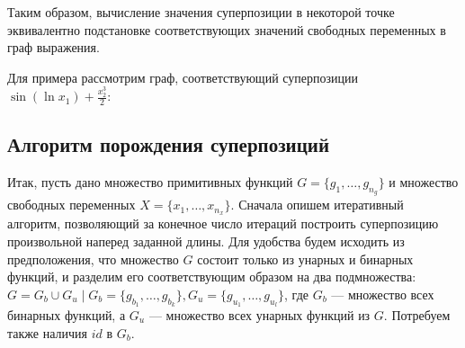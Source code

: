 \documentclass[12pt,a4paper]{amsart}
\begin{document}
Таким образом, вычисление значения суперпозиции в некоторой точке эквивалентно
подстановке соответствующих значений свободных переменных в граф выражения.

Для примера рассмотрим граф, соответствующий суперпозиции
$\sin (\ln x_1) + \frac{x_2^3}{2}$:


\subsection{Алгоритм порождения суперпозиций}

Итак, пусть дано множество примитивных функций $G = \{ g_1, \dots, g_{n_g} \}$ и
множество свободных переменных $X = \{ x_1, \dots, x_{n_x} \}$. Сначала
опишем итеративный алгоритм, позволяющий за конечное число итераций
построить суперпозицию произвольной наперед заданной длины. Для удобства
будем исходить из предположения, что множество $G$ состоит только из унарных
и бинарных функций, и разделим его соответствующим образом на два
подмножества:
$G = G_b \cup G_u \mid G_b = \{ g_{b_1}, \dots, g_{b_k} \}, G_u = \{ g_{u_1}, \dots, g_{u_l} \}$,
где $G_b$ --- множество всех бинарных функций, а $G_u$ --- множество всех
унарных функций из $G$. Потребуем также наличия $id$ в $G_b$.
\end{document}
